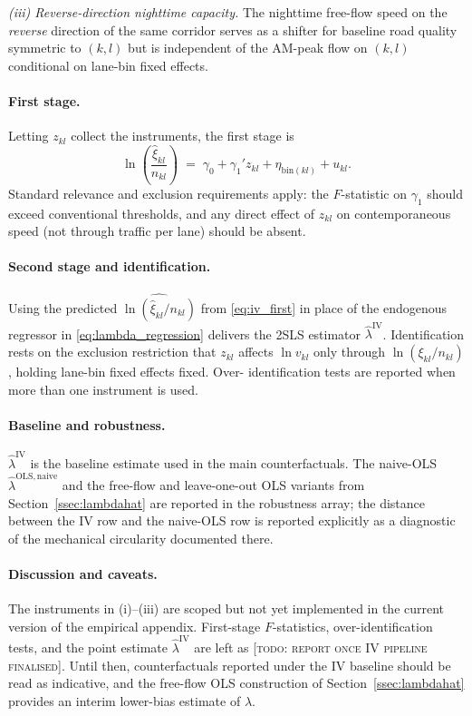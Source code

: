 \emph{(iii) Reverse-direction nighttime capacity.}  The nighttime
free-flow speed on the \emph{reverse} direction of the same corridor
serves as a shifter for baseline road quality symmetric to $(k,l)$
but is independent of the AM-peak flow on $(k,l)$ conditional on
lane-bin fixed effects.

\paragraph{First stage.}
Letting $z_{kl}$ collect the instruments, the first stage is
\begin{equation}
  \ln\!\left(\frac{\hat\xi_{kl}}{n_{kl}}\right)
  \;=\;
  \gamma_{0}
  +\gamma_{1}'z_{kl}
  +\eta_{\mathrm{bin}(kl)}
  +u_{kl}.
  \label{eq:iv_first}
\end{equation}
Standard relevance and exclusion requirements apply: the $F$-statistic
on $\gamma_{1}$ should exceed conventional thresholds, and any
direct effect of $z_{kl}$ on contemporaneous speed (not through
traffic per lane) should be absent.

\paragraph{Second stage and identification.}
Using the predicted $\widehat{\ln(\hat\xi_{kl}/n_{kl})}$ from
\eqref{eq:iv_first} in place of the endogenous regressor in
\eqref{eq:lambda_regression} delivers the 2SLS estimator
$\hat\lambda^{\mathrm{IV}}$.  Identification rests on the exclusion
restriction that $z_{kl}$ affects $\ln v_{kl}$ only through
$\ln(\xi_{kl}/n_{kl})$, holding lane-bin fixed effects fixed.  Over-
identification tests are reported when more than one instrument is
used.

\paragraph{Baseline and robustness.}
$\hat\lambda^{\mathrm{IV}}$ is the baseline estimate used in the
main counterfactuals.  The naive-OLS
$\hat\lambda^{\mathrm{OLS,naive}}$ and the free-flow and
leave-one-out OLS variants from Section~\ref{ssec:lambdahat} are
reported in the robustness array; the distance between the IV row
and the naive-OLS row is reported explicitly as a diagnostic of the
mechanical circularity documented there.

\paragraph{Discussion and caveats.}
The instruments in (i)--(iii) are scoped but not yet implemented in
the current version of the empirical appendix.  First-stage
$F$-statistics, over-identification tests, and the point estimate
$\hat\lambda^{\mathrm{IV}}$ are left as
[\textsc{todo: report once IV pipeline finalised}].  Until then,
counterfactuals reported under the IV baseline should be read as
indicative, and the free-flow OLS construction of
Section~\ref{ssec:lambdahat} provides an interim lower-bias
estimate of $\lambda$.

